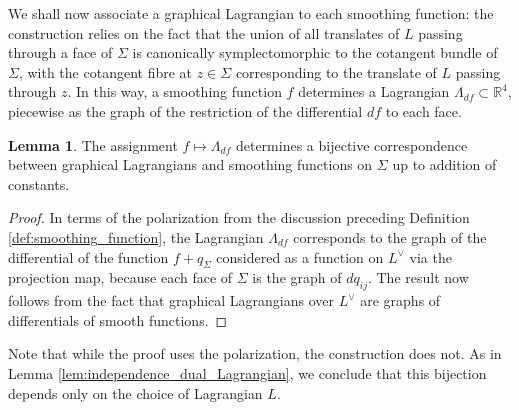\documentclass[11pt]{article}
\newcommand{\bR}{\mathbb{R}}
\theoremstyle{definition}
\newtheorem{lemma}{Lemma}
\begin{document}
 We shall now associate a graphical Lagrangian to each smoothing function: the construction relies on the fact that the union of all translates of $L$ passing through a face of $\Sigma$ is canonically symplectomorphic to the cotangent bundle of $\Sigma$, with the cotangent fibre at $z \in \Sigma$ corresponding to the translate of $L$ passing through $z$. In this way, a smoothing function $f$ determines a Lagrangian $\Lambda_{df} \subset \bR^4$, piecewise as the graph of the restriction of the differential $df$ to each face. 
  \begin{lemma} \label{lem:functions_with_corners}
    The assignment $f \mapsto \Lambda_{df} $  determines a bijective correspondence between graphical Lagrangians and smoothing functions on $\Sigma$ up to addition of constants.
  \end{lemma}
  \begin{proof}
    In terms of the polarization from the discussion preceding Definition \ref{def:smoothing_function}, the Lagrangian $\Lambda_{df}$ corresponds to the graph of the differential of the function $f + q_{\Sigma}$ considered as a function on $L^\vee$ via the projection map, because each face of $\Sigma$ is the graph of $dq_{ij}$. The result now follows from the fact that graphical Lagrangians over $L^\vee$ are graphs of differentials of  smooth functions.
  \end{proof}
Note that while the proof uses the polarization, the construction does not. As in Lemma \ref{lem:independence_dual_Lagrangian}, we conclude that this bijection depends only on the choice of Lagrangian $L$.
\end{document}
